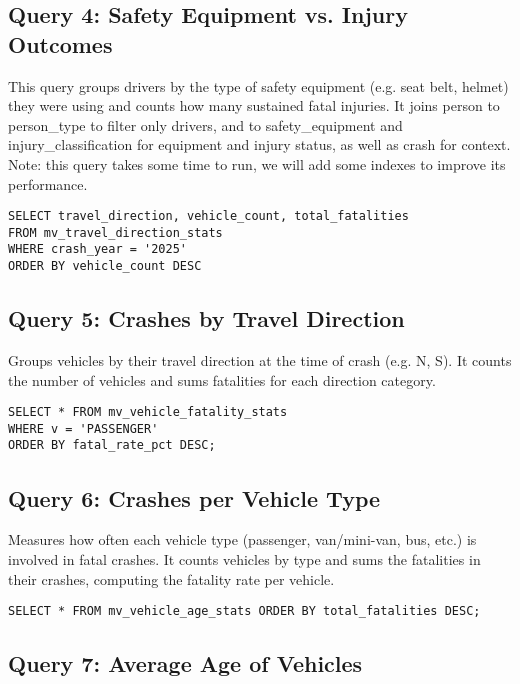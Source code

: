 \documentclass[12pt]{article}
\begin{document}
\subsection{Query 4: Safety Equipment vs. Injury Outcomes}

This query groups drivers by the type of safety equipment (e.g. seat belt, helmet) they were using and counts how many sustained fatal injuries. It joins person to person\_type to filter only drivers, and to safety\_equipment and injury\_classification for equipment and injury status, as well as crash for context. Note: this query takes some time to run, we will add some indexes to improve its performance.

{\scriptsize
\begin{verbatim}
SELECT travel_direction, vehicle_count, total_fatalities
FROM mv_travel_direction_stats 
WHERE crash_year = '2025'
ORDER BY vehicle_count DESC
\end{verbatim}}

\subsection{Query 5: Crashes by Travel Direction}

Groups vehicles by their travel direction at the time of crash (e.g. N, S). It counts the number of vehicles and sums fatalities for each direction category. 

{\scriptsize
\begin{verbatim}
SELECT * FROM mv_vehicle_fatality_stats 
WHERE v = 'PASSENGER'
ORDER BY fatal_rate_pct DESC;
\end{verbatim}}


\subsection{Query 6: Crashes per Vehicle Type}

Measures how often each vehicle type (passenger, van/mini-van, bus, etc.) is involved in fatal crashes. It counts vehicles by type and sums the fatalities in their crashes, computing the fatality rate per vehicle.

{\scriptsize
\begin{verbatim}
SELECT * FROM mv_vehicle_age_stats ORDER BY total_fatalities DESC;
\end{verbatim}}


\subsection{Query 7: Average Age of Vehicles}
\end{document}
